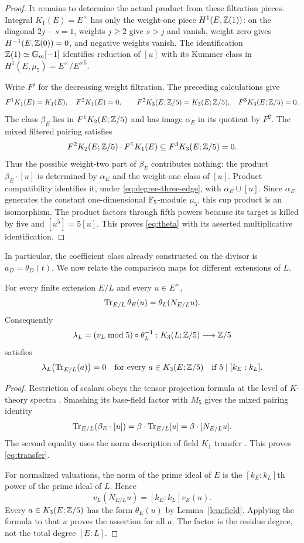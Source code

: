 \begin{proof}
It remains to determine the actual product from these filtration
pieces. Integral $K_1(E)=E^\times$ has only the weight-one piece
$H^1(E,\mathbb Z(1))$: on the diagonal $2j-s=1$, weights $j\geq2$
give $s>j$ and vanish, weight zero gives
$H^{-1}(E,\mathbb Z(0))=0$, and negative weights vanish. The
identification $\mathbb Z(1)\simeq\mathbb G_m[-1]$ identifies reduction
of $[u]$ with its Kummer class in
$H^1(E,\mu_5)=E^\times/E^{\times5}$.

Write $F^j$ for the decreasing weight filtration. The preceding
calculations give
\[
 F^1K_1(E)=K_1(E),\quad F^2K_1(E)=0,\qquad
 F^2K_3(E;\mathbb Z/5)=K_3(E;\mathbb Z/5),\quad F^3K_3(E;\mathbb Z/5)=0.
\]
The class $\beta_E$ lies in $F^1K_2(E;\mathbb Z/5)$ and has image
$\alpha_E$ in its quotient by $F^2$. The mixed filtered pairing
satisfies
\[
 F^2K_2(E;\mathbb Z/5)\cdot F^1K_1(E)
 \subseteq F^3K_3(E;\mathbb Z/5)=0.
\]
Thus the possible weight-two part of $\beta_E$ contributes nothing:
the product
$\beta_E\cdot[u]$ is determined by $\alpha_E$ and the
weight-one class of $[u]$. Product compatibility identifies it,
under \eqref{eq:degree-three-edge}, with
$\alpha_E\cup[u]$.
Since $\alpha_E$ generates the constant one-dimensional
$\mathbb F_5$-module $\mu_5$, this cup product is an isomorphism.
The product factors through fifth powers because its target is
killed by five and $[u^5]=5[u]$. This proves
\eqref{eq:theta} with its asserted multiplicative identification.
\end{proof}

In particular, the coefficient class already constructed on the
divisor is $a_D=\theta_D(t)$. We now relate the comparison maps for
different extensions of $L$.

\begin{lemma}\label{lem:norm-detector}
For every finite extension $E/L$
and every $u\in E^\times$,
\begin{equation}\label{eq:transfer}
 \operatorname{Tr}_{E/L}\theta_E(u)=\theta_L(N_{E/L}u).
\end{equation}
Consequently
\[
 \lambda_L=(v_L\bmod5)\circ\theta_L^{-1}:
 K_3(L;\mathbb Z/5)\longrightarrow\mathbb Z/5
\]
satisfies
\[
 \lambda_L\bigl(\operatorname{Tr}_{E/L}(a)\bigr)=0
 \quad\text{for every }a\in K_3(E;\mathbb Z/5)
 \quad\text{if }5\mid[k_E:k_L].
\]
\end{lemma}

\begin{proof}
Restriction of scalars obeys the tensor projection formula at the
level of $K$-theory spectra \cite[V.3.3.2]{Weibel}. Smashing its
base-field factor with $M_5$ gives the mixed pairing identity
\[
 \operatorname{Tr}_{E/L}(\beta_E\cdot[u])
 =\beta\cdot\operatorname{Tr}_{E/L}[u]
 =\beta\cdot[N_{E/L}u].
\]
The second equality uses the norm description of field $K_1$
transfer \cite[III.1.7.1 and the following paragraph]{Weibel}. This proves
\eqref{eq:transfer}.

For normalized valuations, the norm of the prime ideal of $E$
is the $[k_E:k_L]$th power of the prime ideal of $L$. Hence
\[
 v_L(N_{E/L}u)=[k_E:k_L]v_E(u).
\]
Every $a\in K_3(E;\mathbb Z/5)$ has the form $\theta_E(u)$ by
Lemma~\ref{lem:field}. Applying the formula to that $u$ proves
the assertion for all $a$. The factor is the residue degree,
not the total degree $[E:L]$.
\end{proof}
